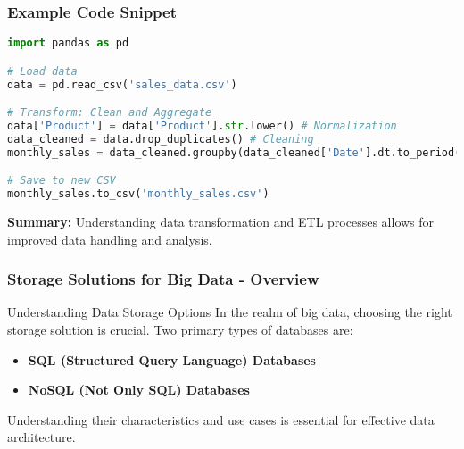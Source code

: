\documentclass[aspectratio=169]{beamer}
\begin{document}
\begin{frame}[fragile]
    \frametitle{Example Code Snippet}
    \begin{lstlisting}[language=Python]
import pandas as pd

# Load data
data = pd.read_csv('sales_data.csv')

# Transform: Clean and Aggregate
data['Product'] = data['Product'].str.lower() # Normalization
data_cleaned = data.drop_duplicates() # Cleaning
monthly_sales = data_cleaned.groupby(data_cleaned['Date'].dt.to_period('M')).agg({'Sales': 'sum'}) # Aggregation

# Save to new CSV
monthly_sales.to_csv('monthly_sales.csv')
    \end{lstlisting}
    
    \textbf{Summary:} Understanding data transformation and ETL processes allows for improved data handling and analysis.
\end{frame}

\begin{frame}[fragile]
    \frametitle{Storage Solutions for Big Data - Overview}
    \begin{block}{Understanding Data Storage Options}
        In the realm of big data, choosing the right storage solution is crucial. Two primary types of databases are:
        \begin{itemize}
            \item \textbf{SQL (Structured Query Language) Databases}
            \item \textbf{NoSQL (Not Only SQL) Databases}
        \end{itemize}
        Understanding their characteristics and use cases is essential for effective data architecture.
    \end{block}
\end{frame}
\end{document}
